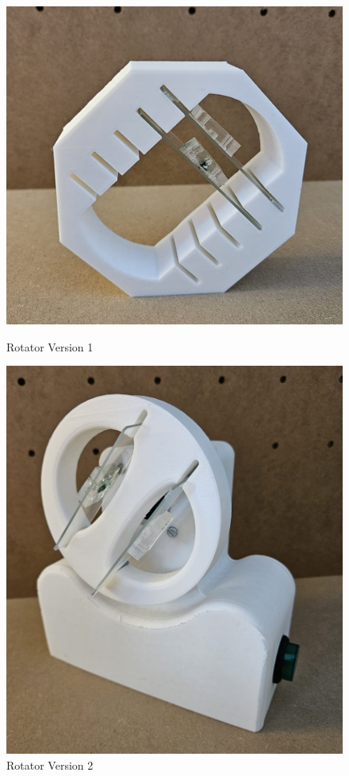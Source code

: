 \documentclass[letterpaper,12pt]{article}
\begin{document}
\begin{figure}[h]
    \begin{minipage}[b]{0.45\textwidth}
        \centering
        \includegraphics[width=\textwidth]{figures/Rotator1.jpg}
        \caption{Rotator Version 1}\label{fig:Rotator1}
    \end{minipage}
    \hfill
    \begin{minipage}[b]{0.4
    \textwidth}
        \centering
        \includegraphics[width=\textwidth]{figures/Rotator2.jpg}
        \caption{Rotator Version 2}\label{fig:Rotator2}
    \end{minipage}
\end{figure}
\end{document}
